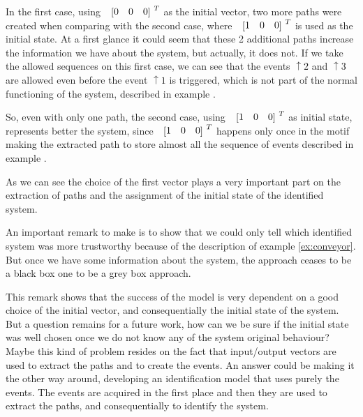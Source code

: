   In the first case, using $\colvec{0&0&0}^T$ as the initial vector, two more
  paths were created when comparing with the second case, where
  $\colvec{1&0&0}^T$ is used as the initial state. At a first glance it could
  seem that these 2 additional paths increase the information we have about the system,
  but actually, it does not. If we take the allowed
  sequences on this first case, we can see that the events $\uparrow 2$ and
  $\uparrow 3$ are allowed even before the event $\uparrow 1$ is triggered,
  which is not part of the normal functioning of the system, described in
  example .

  So, even with only one path, the second case, using $\colvec{1&0&0}^T$ as
  initial state, represents better the system, since $\colvec{1&0&0}^T$ happens
  only once in the motif making the extracted path to store almost all the
  sequence of events described in example .

  As we can see the choice of the first vector plays a very important part on
  the
  extraction of paths and the assignment of the initial state of the identified
  system.
  \begin{observation}
  An important remark to make is to show that we could only tell
  which identified system was more trustworthy because of the description of
  example \ref{ex:conveyor}. But once we have some information about the system,
  the approach ceases to be a black box one to be a grey box approach. 
\end{observation}

This remark shows that the success of the \DAOCT{} model is very dependent on a good
choice of the initial vector, and consequentially the initial state of the
system. But a question remains for a future work, how can we be sure if the
initial state was well chosen once we do not know any of the system original behaviour?
Maybe this kind of problem resides on the fact that input\slash output vectors
are used to extract the paths and to create the events. An answer could be
making it the other way around, developing an identification model that uses purely
the events. The events are acquired in the first place and then they are used to
extract the paths, and consequentially to identify the system.
